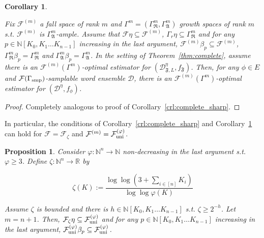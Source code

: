 \documentclass{article}
\numberwithin{equation}{section}
\theoremstyle{definition}
\theoremstyle{plain}
\newtheorem{proposition}{Proposition}[section]
\newtheorem{corollary}{Corollary}[section]
\newcommand{\Nats}{\mathbb{N}}
\newcommand{\Reals}{\mathbb{R}}
\newcommand{\NatPoly}{\Nats[K_0, K_1 \ldots K_{n-1}]}
\newcommand{\Dist}{\mathcal{D}}
\newcommand{\GrowR}{\Gamma_{\mathfrak{R}}}
\newcommand{\GrowA}{\Gamma_{\mathfrak{A}}}
\newcommand{\Fall}{\mathcal{F}}
\newcommand{\FallUt}[1]{{\Fall_{\textnormal{uni}}^{(#1)}}}
\begin{document}
\begin{samepage}
\begin{corollary}
\label{crl:complete}

Fix ${\Fall^{(m)}}$ a fall space of rank ${m}$ and ${\Gamma^m=(\GrowR^m, \GrowA^m)}$ growth spaces of rank ${m}$ s.t. ${\Fall^{(m)}}$ is ${\GrowA^m}$-ample. Assume that ${\Fall \eta \subseteq \Fall^{(m)}}$, ${\Gamma_r \eta \subseteq \GrowR^{m}}$ and for any ${p \in \NatPoly}$ increasing in the last argument, ${\Fall^{(m)} \beta_p \subseteq \Fall^{(m)}}$, ${\GrowR^m \beta_p = \GrowR^m}$ and ${\GrowA^m \beta_p = \GrowA^m}$. In the setting of Theorem~\ref{thm:complete}, assume there is an ${\Fall^{(m)}(\Gamma^m)}$-optimal estimator for ${(\Dist_{\mathfrak{F},L}^\eta,f_{\mathfrak{F}})}$. Then, for any ${\phi \in E}$ and ${\Fall(\Gamma_{\textnormal{smp}})}$-samplable word ensemble ${\Dist}$, there is an ${\Fall^{(m)}(\Gamma^m)}$-optimal estimator for ${(\Dist^\eta,f_\phi)}$.
\end{corollary}
\end{samepage}

\begin{proof}

Completely analogous to proof of Corollary~\ref{crl:complete_sharp}.
%
\end{proof}

In particular, the conditions of Corollary~\ref{crl:complete_sharp} and Corollary~\ref{crl:complete} can hold for ${\Fall=\Fall_\zeta}$ and ${\Fall^{(m)}=\FallUt{\varphi}}$.

\begin{samepage}
\begin{proposition}

Consider ${\varphi: \Nats^n \rightarrow \Nats}$ non-decreasing in the last argument s.t. ${\varphi \geq 3}$. Define ${\zeta: \Nats^n \rightarrow \Reals}$ by

\begin{equation}
\zeta(K):=\frac{\log \log (3+\sum_{i \in [n]} K_i)}{\log \log \varphi(K)}
\end{equation}

Assume ${\zeta}$ is bounded and there is ${h \in \NatPoly}$ s.t. ${\zeta \geq 2^{-h}}$. Let ${m = n + 1}$. Then, ${\Fall_\zeta \eta \subseteq \FallUt{\varphi}}$ and for any ${p \in \NatPoly}$ increasing in the last argument, ${\FallUt{\varphi} \beta_p \subseteq \FallUt{\varphi}}$.

\end{proposition}
\end{samepage}
\end{document}

